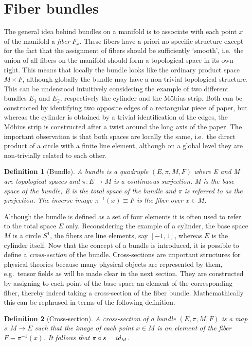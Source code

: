 \documentclass[12pt,twoside]{book}
\newtheorem{definition}{Definition}[chapter]
\begin{document}
\section{Fiber bundles}

The general idea behind bundles on a manifold is to associate with each point $x$ of the manifold a \emph{fiber} $F_{x}$. These fibers have a-priori no specific structure except for the fact that the assignment of fibers should be sufficiently `smooth', i.e.\ the union of all fibers on the manifold should form a topological space in its own right. This means that locally the bundle looks like the ordinary product space $M \times F$, although globally the bundle may have a non-trivial topological structure. This can be understood intuitively considering the example of two different bundles $E_{1}$ and $E_{2}$, respectively the cylinder and the M\"obius strip. Both can be constructed by identifying two opposite edges of a rectangular piece of paper, but whereas the cylinder is obtained by a trivial identification of the edges, the M\"obius strip is constructed after a twist around the long axis of the paper. The important observation is that both spaces are locally the same, i.e.\ the direct product of a circle with a finite line element, although on a global level they are non-trivially related to each other.
\begin{definition}[Bundle]
A bundle is a quadruple $(E,\pi,M,F)$ where E and M are topological spaces and $\pi : E \rightarrow M$ is a continuous surjection. M is the base space of the bundle, E is the total space of the bundle and $\pi$ is referred to as the projection. The inverse image $\pi^{-1}(x)\equiv F$ is the fiber over $x\in M$. 
\end{definition}
Although the bundle is defined as a set of four elements it is often used to refer to the total space $E$ only.  Reconsidering the example of a cylinder, the base space $M$ is a circle $S^{1}$, the fibers are line elements, say $[-1,1]$, whereas $E$ is the cylinder itself. Now that the concept of a bundle is introduced, it is possible to define a \emph{cross-section} of the bundle. Cross-sections are important structures for physical theories because many physical objects are represented by them, e.g.\ tensor fields as will be made clear in the next section. They are constructed by assigning to each point of the base space an element of the corresponding fiber, thereby indeed taking a cross-section of the fiber bundle. Mathemathically this can be rephrased in terms of the following definition.
\begin{definition}[Cross-section]
A cross-section of a bundle $(E,\pi,M,F)$ is a map $s: M \rightarrow E$ such that the image of each point $x \in M$ is an element of the fiber $F \equiv \pi^{-1}(x)$. It follows that $\pi\circ s = \emph{id}_{M}$.
\end{definition}
\end{document}

